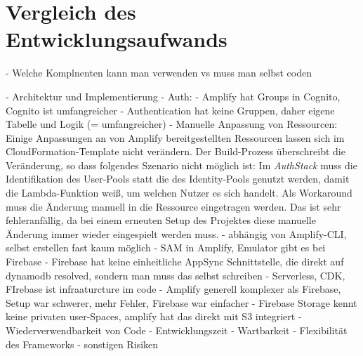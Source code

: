 \chapter{Vergleich des Entwicklungsaufwands}

- Welche Komplnenten kann man verwenden vs muss man selbst coden


- Architektur und Implementierung
  - Auth:
    - Amplify hat Groups in Cognito, Cognito ist umfangreicher
    - Authentication hat keine Gruppen, daher eigene Tabelle und Logik (= umfangreicher)
  - Manuelle Anpassung von Ressourcen: Einige Anpassungen an von Amplify bereitgestellten Ressourcen lassen sich im CloudFormation-Template nicht verändern. Der Build-Prozess überschreibt die Veränderung, so dass folgendes Szenario nicht möglich ist: Im \textit{AuthStack} muss die Identifikation des User-Pools statt die des Identity-Pools genutzt werden, damit die Lambda-Funktion weiß, um welchen Nutzer es sich handelt. Als Workaround muss die Änderung manuell in die Ressource eingetragen werden. Das ist sehr fehleranfällig, da bei einem erneuten Setup des Projektes diese manuelle Änderung immer wieder eingespielt werden muss.
    - abhängig von Amplify-CLI, selbst erstellen fast kaum möglich
 - SAM in Amplify, Emulator gibt es bei Firebase
 - Firebase hat keine einheitliche AppSync Schnittstelle, die direkt auf dynamodb resolved, sondern man muss das selbst schreiben
 - Serverless, CDK, FIrebase ist infraaturcture im code
 - Amplify generell komplexer als Firebase, Setup war schwerer, mehr Fehler, Firebase war einfacher
 - Firebase Storage kennt keine privaten user-Spaces, amplify hat das direkt mit S3 integriert
- Wiederverwendbarkeit von Code
- Entwicklungszeit
- Wartbarkeit
- Flexibilität des Frameworks
- sonstigen Risiken